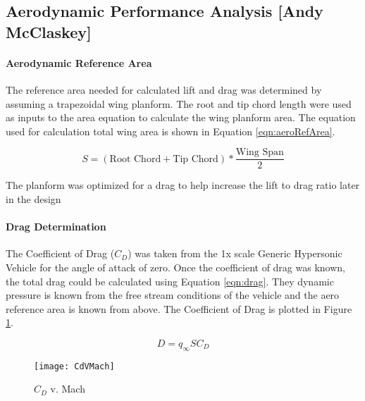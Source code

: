 \subsection{Aerodynamic Performance Analysis [Andy McClaskey]}
\paragraph{Aerodynamic Reference Area}
The reference area needed for calculated lift and drag was determined by assuming a trapezoidal wing planform. The root and tip chord length were used as inputs to the area equation to calculate the wing planform area. The equation used for calculation total wing area is shown in Equation \ref{eqn:aeroRefArea}.

\begin{equation}
\label{eqn:aeroRefArea}
S = (\text{Root Chord} + \text{Tip Chord})*\frac{\text{Wing Span}}{2}
\end{equation}

The planform was optimized for a drag to help increase the lift to drag ratio later in the design

\paragraph{Drag Determination}

The Coefficient of Drag ($C_D$) was taken from the 1x scale Generic Hypersonic Vehicle \cite{ghv} for the angle of attack of zero. Once the coefficient of drag was known, the total drag could be calculated using Equation \ref{eqn:drag}. They dynamic pressure is known from the free stream conditions of the vehicle and the aero reference area is known from above. The Coefficient of Drag is plotted in Figure \ref{fig:CdVMach}.

\begin{equation}
\label{eqn:drag}
D = q_{\infty}SC_D
\end{equation}



\begin{figure}[H]
\begin{center}
\texttt{[image: CdVMach]}
\caption{$C_D$ v. Mach}
\label{fig:CdVMach}
\end{center}
\end{figure}

\begin{comment}
The total drag for the vehicle is shown in Figure \ref{fig:dragVMach}.

\begin{figure}[H]
\begin{center}
\texttt{[image: dragVMach]}
\caption{Drag v. Mach}
\label{fig:dragVMach}
\end{center}
\end{figure}

\end{comment}

